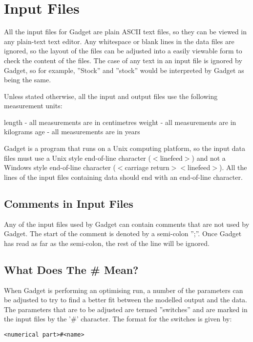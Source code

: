 \documentclass [a4paper, 10pt]{book}
\begin{document}
\chapter{Input Files}\label{chap:input}
All the input files for Gadget are plain ASCII text files, so they can be viewed in any plain-text text editor.  Any whitespace or blank lines in the data files are ignored, so the layout of the files can be adjusted into a easily viewable form to check the content of the files.  The case of any text in an input file is ignored by Gadget, so for example, ''Stock'' and ''stock'' would be interpreted by Gadget as being the same.

\bigskip
Unless stated otherwise, all the input and output files use the following measurement units:\newline

length - all measurements are in centimetres\newline
weight - all measurements are in kilograms\newline
age - all measurements are in years

\bigskip
Gadget is a program that runs on a Unix computing platform, so the input data files must use a Unix style end-of-line character ($<$linefeed$>$) and not a Windows style end-of-line character ($<$carriage return$><$linefeed$>$).  All the lines of the input files containing data should end with an end-of-line character.

\section{Comments in Input Files}\label{sec:comments}
Any of the input files used by Gadget can contain comments that are not used by Gadget.  The start of the comment is denoted by a semi-colon '';''.  Once Gadget has read as far as the semi-colon, the rest of the line will be ignored.

\newpage
\section{What Does The \# Mean?}\label{sec:whatdoeshash}
When Gadget is performing an optimising run, a number of the parameters can be adjusted to try to find a better fit between the modelled output and the data.  The parameters that are to be adjusted are termed ''switches'' and are marked in the input files by the '\#' character.  The format for the switches is given by:

{\small\begin{verbatim}
<numerical part>#<name>
\end{verbatim}}
\end{document}
